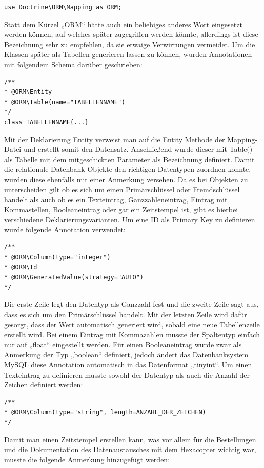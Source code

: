 	\lstset{language=php}
  	\begin{lstlisting}
use Doctrine\ORM\Mapping as ORM;
  	\end{lstlisting}
Statt dem Kürzel „ORM“ hätte auch ein beliebiges anderes Wort eingesetzt werden können, auf welches später zugegriffen werden könnte, allerdings ist diese Bezeichnung sehr zu empfehlen, da sie etwaige Verwirrungen vermeidet.
Um die Klassen später als Tabellen generieren lassen zu können, wurden Annotationen mit folgendem Schema darüber geschrieben:

	\lstset{language=php}
  	\begin{lstlisting}
/**
* @ORM\Entity
* @ORM\Table(name="TABELLENNAME")
*/
class TABELLENNAME{...}
  	\end{lstlisting}
Mit der Deklarierung Entity verweist man auf die Entity Methode der Mapping-Datei und erstellt somit den Datensatz. Anschließend wurde dieser mit Table() als Tabelle mit dem mitgeschickten Parameter als Bezeichnung definiert.
Damit die relationale Datenbank Objekte den richtigen Datentypen zuordnen konnte, wurden diese ebenfalls mit einer Anmerkung versehen. Da es bei Objekten zu unterscheiden gilt ob es sich um einen Primärschlüssel oder Fremdschlüssel handelt als auch ob es ein Texteintrag, Ganzzahleneintrag, Eintrag mit Kommastellen, Booleaneintrag oder gar ein Zeitstempel ist, gibt es hierbei verschiedene Deklarierungsvarianten.
Um eine ID als Primary Key zu definieren wurde folgende Annotation verwendet:
	\lstset{language=php}
  	\begin{lstlisting}
/**
* @ORM\Column(type="integer")
* @ORM\Id
* @ORM\GeneratedValue(strategy="AUTO")
*/
  	\end{lstlisting}
Die erste Zeile legt den Datentyp als Ganzzahl fest und die zweite Zeile sagt aus, dass es sich um den Primärschlüssel handelt. Mit der letzten Zeile wird dafür gesorgt, dass der Wert automatisch generiert wird, sobald eine neue Tabellenzeile erstellt wird.
Bei einem Eintrag mit Kommazahlen musste der Spaltentyp einfach nur auf „float“ eingestellt werden. Für einen Booleaneintrag wurde zwar als Anmerkung der Typ „boolean“ definiert, jedoch ändert das Datenbanksystem MySQL diese Annotation automatisch in das Datenformat „tinyint“.
Um einen Texteintrag zu definieren musste sowohl der Datentyp als auch die Anzahl der Zeichen definiert werden:

	\lstset{language=php}
  	\begin{lstlisting}
/**
* @ORM\Column(type="string", length=ANZAHL_DER_ZEICHEN)
*/
  	\end{lstlisting}
Damit man einen Zeitstempel erstellen kann, was vor allem für die Bestellungen und die Dokumentation des Datenaustausches mit dem Hexacopter wichtig war, musste die folgende Anmerkung hinzugefügt werden:

